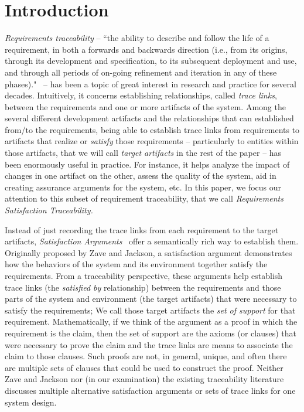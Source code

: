 \section{Introduction}

\emph{Requirements traceability} -- ``the ability to describe and follow the life of a requirement, in both a forwards and backwards direction (i.e., from its origins, through its development and specification, to its subsequent deployment and use, and through all periods of on-going refinement and iteration in any of these phases)."~\cite{gotel} -- has been a topic of great interest in research and practice for several decades. Intuitively, it concerns establishing relationships, called \emph{trace links}, between the requirements and one or more artifacts of the system. Among the several different development artifacts and the relationships that can established from/to the requirements, being able to establish trace links from requirements to artifacts that realize or \emph{satisfy} those requirements -- particularly to entities within those artifacts, that we will call \emph{target artifacts} in the rest of the paper -- has been enormously useful in practice. For instance, it helps analyze the impact of changes in one artifact on the other, assess the quality of the system, aid in creating assurance arguments for the system, etc. In this paper, we focus our attention to this subset of requirement traceability, that we call \emph{Requirements Satisfaction Traceability.}

Instead of just recording the trace links from each requirement to the target artifacts, \emph{Satisfaction Arguments}~\cite{zave1997four} offer a semantically rich way to establish them. Originally proposed by Zave and Jackson, a satisfaction argument demonstrates how the behaviors of the system and its environment together satisfy the requirements. From a traceability perspective, these arguments help establish trace links (the \emph{satisfied by} relationship) between the requirements and those parts of the system and environment (the target artifacts) that were necessary to satisfy the requirements; We call those target artifacts the \emph{set of support} for that requirement. Mathematically, if we think of the argument as a proof in which the requirement is the claim, then the set of support are the axioms (or clauses) that were necessary to prove the claim and the trace links are means to associate the claim to those clauses. Such proofs are not, in general, unique, and often there are multiple sets of clauses that could be used to construct the proof.  Neither Zave and Jackson nor (in our examination) the existing traceability literature discusses multiple alternative satisfaction arguments or sets of trace links for one system design.

